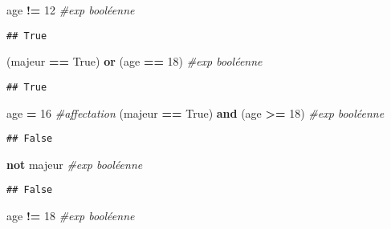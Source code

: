 \documentclass[
]{book}
\newenvironment{Shaded}{\begin{snugshade}}{\end{snugshade}}
\newcommand{\CommentTok}[1]{\textcolor[rgb]{0.56,0.35,0.01}{\textit{#1}}}
\newcommand{\DecValTok}[1]{\textcolor[rgb]{0.00,0.00,0.81}{#1}}
\newcommand{\KeywordTok}[1]{\textcolor[rgb]{0.13,0.29,0.53}{\textbf{#1}}}
\newcommand{\NormalTok}[1]{#1}
\newcommand{\OperatorTok}[1]{\textcolor[rgb]{0.81,0.36,0.00}{\textbf{#1}}}
\newcommand{\VariableTok}[1]{\textcolor[rgb]{0.00,0.00,0.00}{#1}}
\begin{document}
\begin{Shaded}
\begin{Highlighting}[]
\NormalTok{age }\OperatorTok{!=} \DecValTok{12} \CommentTok{\#exp booléenne}
\end{Highlighting}
\end{Shaded}

\begin{verbatim}
## True
\end{verbatim}

\begin{Shaded}
\begin{Highlighting}[]
\NormalTok{(majeur }\OperatorTok{==} \VariableTok{True}\NormalTok{) }\KeywordTok{or}\NormalTok{ (age }\OperatorTok{==} \DecValTok{18}\NormalTok{) }\CommentTok{\#exp booléenne}
\end{Highlighting}
\end{Shaded}

\begin{verbatim}
## True
\end{verbatim}

\begin{Shaded}
\begin{Highlighting}[]
\NormalTok{age }\OperatorTok{=} \DecValTok{16} \CommentTok{\#affectation}
\NormalTok{(majeur }\OperatorTok{==} \VariableTok{True}\NormalTok{) }\KeywordTok{and}\NormalTok{ (age }\OperatorTok{\textgreater{}=} \DecValTok{18}\NormalTok{) }\CommentTok{\#exp booléenne}
\end{Highlighting}
\end{Shaded}

\begin{verbatim}
## False
\end{verbatim}

\begin{Shaded}
\begin{Highlighting}[]
\KeywordTok{not}\NormalTok{ majeur }\CommentTok{\#exp booléenne}
\end{Highlighting}
\end{Shaded}

\begin{verbatim}
## False
\end{verbatim}

\begin{Shaded}
\begin{Highlighting}[]
\NormalTok{age }\OperatorTok{!=} \DecValTok{18} \CommentTok{\#exp booléenne}
\end{Highlighting}
\end{Shaded}
\end{document}
